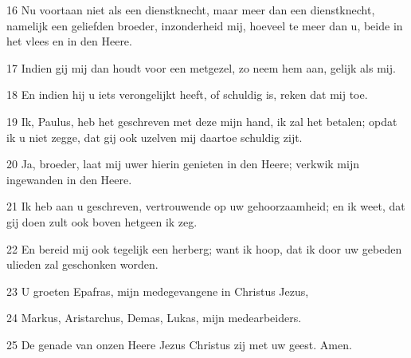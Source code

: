 \par 16 Nu voortaan niet als een dienstknecht, maar meer dan een dienstknecht, namelijk een geliefden broeder, inzonderheid mij, hoeveel te meer dan u, beide in het vlees en in den Heere.
\par 17 Indien gij mij dan houdt voor een metgezel, zo neem hem aan, gelijk als mij.
\par 18 En indien hij u iets verongelijkt heeft, of schuldig is, reken dat mij toe.
\par 19 Ik, Paulus, heb het geschreven met deze mijn hand, ik zal het betalen; opdat ik u niet zegge, dat gij ook uzelven mij daartoe schuldig zijt.
\par 20 Ja, broeder, laat mij uwer hierin genieten in den Heere; verkwik mijn ingewanden in den Heere.
\par 21 Ik heb aan u geschreven, vertrouwende op uw gehoorzaamheid; en ik weet, dat gij doen zult ook boven hetgeen ik zeg.
\par 22 En bereid mij ook tegelijk een herberg; want ik hoop, dat ik door uw gebeden ulieden zal geschonken worden.
\par 23 U groeten Epafras, mijn medegevangene in Christus Jezus,
\par 24 Markus, Aristarchus, Demas, Lukas, mijn medearbeiders.
\par 25 De genade van onzen Heere Jezus Christus zij met uw geest. Amen.




